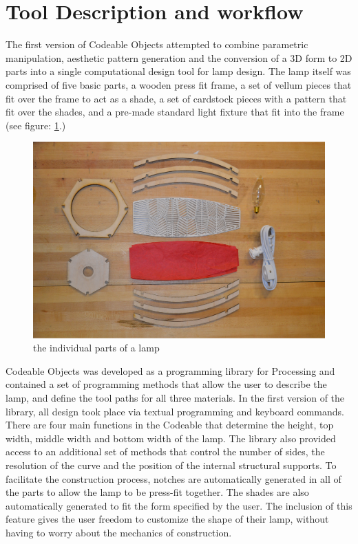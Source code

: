 \section{Tool Description and workflow}
The first version of Codeable Objects attempted to combine parametric manipulation, aesthetic pattern generation and the conversion of a 3D form to 2D parts into a single computational design tool for lamp design. The lamp itself was comprised of five basic parts, a wooden press fit frame, a set of vellum pieces that fit over the frame to act as a shade, a set of cardstock pieces with a pattern that fit over the shades, and a pre-made standard light fixture that fit into the frame (see figure: \ref{fig:lamp_parts}.)
\begin{center}
\begin{figure}[h!]
\includegraphics[width=\columnwidth]{images/parts.png}
\caption{the individual parts of a lamp}
\label{fig:lamp_parts}
\end{figure}
\end{center}
\vspace{-20pt}

Codeable Objects was developed as a programming library for Processing and contained a set of programming methods that allow the user to describe the lamp, and define the tool paths for all three materials. In the first version of the library, all design took place via textual programming and keyboard commands. There are four main functions in the Codeable that determine the height, top width, middle width and bottom width of the lamp. The library also provided access to an additional set of methods that control the number of sides, the resolution of the curve and the position of the internal structural supports. To facilitate the construction process, notches are automatically generated in all of the parts to allow the lamp to be press-fit together. The shades are also automatically generated to fit the form specified by the user. The inclusion of this feature gives the user freedom to customize the shape of their lamp, without having to worry about the mechanics of construction.

